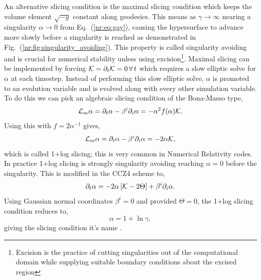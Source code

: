 An alternative slicing condition is the maximal slicing condition which keeps the volume element $\sqrt{-g}$ constant along geodesics. This means as $\gamma\rightarrow\infty$ nearing a singularity $\alpha\rightarrow0$ from Eq.~(\ref{nr:eq:gay}), causing the hypersurface to advance more slowly before a singularity is reached as demonstrated in Fig.~(\ref{nr:fig:singularity_avoiding}). This property is called singularity avoiding and is crucial for numerical stability unless using excision\footnote{Excision is the practice of cutting singularities out of the computational domain while supplying suitable boundary conditions about the excised region}. Maximal slicing can be implemented by forcing $\mathcal{K} = \partial_t \mathcal{K} = 0\,\forall \,t$ which requires a slow elliptic solve for $\alpha$ at each timestep. Instead of performing this slow elliptic solve, $\alpha$ is promoted to an evolution variable and is evolved along with every other simulation variable. To do this we can pick an algebraic slicing condition of the Bona-Masso type,
\begin{equation}\mathcal{L}_m \alpha = \partial_t \alpha - \beta^i \partial_i \alpha = -\alpha^2 f(\alpha)\mathcal{K}. \end{equation}
Using this with $f = 2\alpha^{-1}$ gives,
\begin{equation}\mathcal{L}_m \alpha = \partial_t \alpha - \beta^i \partial_i \alpha = -2\alpha \mathcal{K}, \label{nr:eq:1pluslog} \end{equation}
which is called 1+log slicing; this is very common in Numerical Relativity codes. In practice 1+log slicing is strongly singularity avoiding reaching $\alpha=0$ before the singularity. This is modified in the CCZ4 scheme to,
\begin{equation}\partial_t \alpha = -2\alpha\left[ \mathcal{K}-2\Theta\right] + \beta^i \partial_i \alpha.\end{equation}
Using Gaussian normal coordinates $\beta^i=0$ and provided $\Theta=0$, the 1+log slicing condition reduces to,
\begin{equation} \alpha = 1+ \ln \gamma,\end{equation}
giving the slicing condition it's name \cite{alcubierre2008introduction}.


